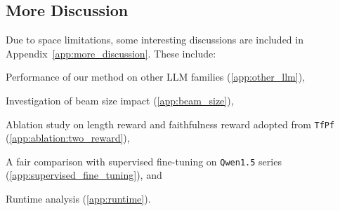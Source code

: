 \subsection{More Discussion}
Due to space limitations, some interesting discussions are included in Appendix~\ref{app:more_discussion}.
These include:
\begin{inparaenum}[\itshape a)]
    \item Performance of our method on other LLM families (\ref{app:other_llm}),
    \item Investigation of beam size impact (\ref{app:beam_size}),
    \item Ablation study on length reward and faithfulness reward adopted from \texttt{TfPf} (\ref{app:ablation:two_reward}),
    \item A fair comparison with supervised fine-tuning on \texttt{Qwen1.5} series (\ref{app:supervised_fine_tuning}), and
    \item Runtime analysis (\ref{app:runtime}).
\end{inparaenum}
